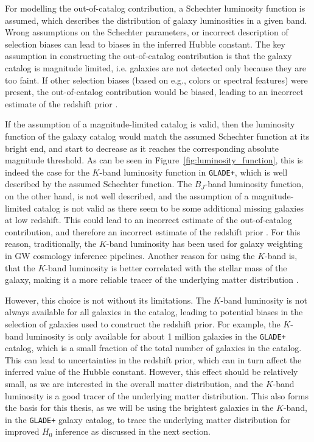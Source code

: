For modelling the out-of-catalog contribution, a Schechter luminosity function is assumed, which describes the distribution of galaxy luminosities in a given band. Wrong assumptions on the Schechter parameters, or incorrect description of selection biases can lead to biases in the inferred Hubble constant. The key assumption in constructing the out-of-catalog contribution is that the galaxy catalog is magnitude limited, i.e. galaxies are not detected only because they are too faint. If other selection biases (based on e.g., colors or spectral features) were present, the out-of-catalog contribution would be biased, leading to an incorrect estimate of the redshift prior \citep{abbott2023constraints}. 

If the assumption of a magnitude-limited catalog is valid, then the luminosity function of the galaxy catalog would match the assumed Schechter function at its bright end, and start to decrease as it reaches the corresponding absolute magnitude threshold. As can be seen in Figure~\ref{fig:luminosity_function}, this is indeed the case for the $K$-band luminosity function in \texttt{GLADE+}, which is well described by the assumed Schechter function. The $B_J$-band luminosity function, on the other hand, is not well described, and the assumption of a magnitude-limited catalog is not valid as there seem to be some additional missing galaxies at low redshift. This could lead to an incorrect estimate of the out-of-catalog contribution, and therefore an incorrect estimate of the redshift prior \citep{abbott2023constraints}. For this reason, traditionally, the $K$-band luminosity has been used for galaxy weighting in \ac{GW} cosmology inference pipelines. Another reason for using the $K$-band is, that the $K$-band luminosity is better correlated with the stellar mass of the galaxy, making it a more reliable tracer of the underlying matter distribution \citep{strazzullo2006near,sureshkumar2021galaxy,abbott2023constraints}. 

However, this choice is not without its limitations. The $K$-band luminosity is not always available for all galaxies in the catalog, leading to potential biases in the selection of galaxies used to construct the redshift prior. For example, the $K$-band luminosity is only available for about 1 million galaxies in the \texttt{GLADE+} catalog, which is a small fraction of the total number of galaxies in the catalog. This can lead to uncertainties in the redshift prior, which can in turn affect the inferred value of the Hubble constant. However, this effect should be relatively small, as we are interested in the overall matter distribution, and the $K$-band luminosity is a good tracer of the underlying matter distribution. This also forms the basis for this thesis, as we will be using the brightest galaxies in the $K$-band, in the \texttt{GLADE+} galaxy catalog, to trace the underlying matter distribution for improved $H_0$ inference as discussed in the next section.

